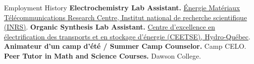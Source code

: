 \begin{rubric}{Employment History}
%
	\textbf{Electrochemistry Lab Assistant.} \href{https://inrs.ca/en/inrs/research-centres/energie-materiaux-telecommunications-research-centre/}{Énergie Matériaux Télécommunications Research Centre, Institut national de recherche scientifique (INRS)\faExternalLinkSquare*}.
%
%
%
	\textbf{Organic Synthesis Lab Assistant.} \href{https://www.hydroquebec.com/ce-electrification-transports-stockage-energie/}{Centre d'excellence en électrification des transports et en stockage d'énergie (CEETSE), Hydro-Québec\faExternalLinkSquare*}.
%
	\textbf{Animateur d'un camp d'été / Summer Camp Counselor.} Camp CELO.
%
%
	\textbf{Peer Tutor in Math and Science Courses.} Dawson College.
\end{rubric}